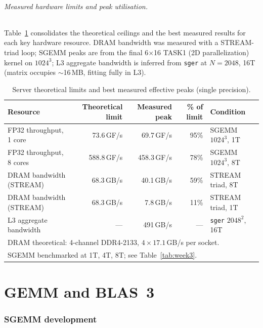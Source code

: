 \documentclass[11pt,a4paper]{article}
\begin{document}
\paragraph{Measured hardware limits and peak utilisation.}
Table~\ref{tab:hw_peaks} consolidates the theoretical ceilings and the best
measured results for each key hardware resource.
DRAM bandwidth was measured with a STREAM-triad loop;
SGEMM peaks are from the final 6$\times$16 TASK1 (2D parallelization) kernel on $1024^3$;
L3 aggregate bandwidth is inferred from \texttt{sger} at $N=2048$, 16T
(matrix occupies $\sim$16\,MB, fitting fully in L3).

\begin{table}[h]
\centering
\caption{Server theoretical limits and best measured effective peaks (single precision).}
\label{tab:hw_peaks}
\small
\begin{tabular}{lrrrl}
\toprule
Resource & Theoretical limit & Measured peak & \% of limit & Condition \\
\midrule
FP32 throughput, 1 core  & 73.6\,GF/s   & 69.7\,GF/s  & 95\% & SGEMM $1024^3$, 1T \\
FP32 throughput, 8 cores & 588.8\,GF/s  & 458.3\,GF/s & 78\% & SGEMM $1024^3$, 8T \\
DRAM bandwidth (STREAM)  & 68.3\,GB/s   & 40.1\,GB/s  & 59\% & STREAM triad, 8T \\
DRAM bandwidth (STREAM)  & 68.3\,GB/s   &  7.8\,GB/s  & 11\% & STREAM triad, 1T \\
L3 aggregate bandwidth   & ---           & 491\,GB/s   & ---  & \texttt{sger} $2048^2$, 16T \\
\bottomrule
\multicolumn{5}{l}{DRAM theoretical: 4-channel DDR4-2133, $4\times17.1$\,GB/s per socket.}\\
\multicolumn{5}{l}{SGEMM benchmarked at 1T, 4T, 8T; see Table~\ref{tab:week3}.}
\end{tabular}
\end{table}

\newpage

\part{GEMM and BLAS~3}

\section{SGEMM development}
\end{document}
